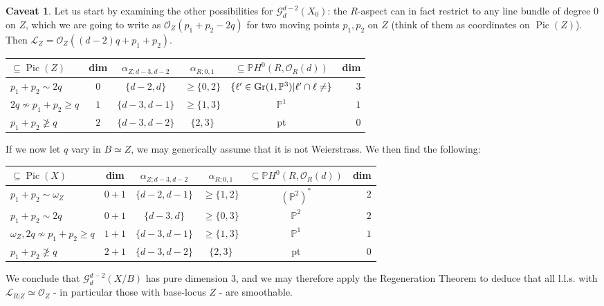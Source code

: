\documentclass[11pt]{amsart}
\newcommand{\PP}{\mathbb P}
\newcommand{\OO}{\mathcal O}
\newcommand{\Pic}{\operatorname{Pic}}
\theoremstyle{plain}
\theoremstyle{definition}
\newtheorem*{caveat}{Caveat}
\begin{document}
\begin{caveat}
 Let us start by examining the other possibilities for $\mathcal G^{d-2}_d(X_0)$: the $R$-aspect can in fact restrict to any line bundle of degree $0$ on $Z$, which we are going to write as $\OO_Z(p_1+p_2-2q)$ for two moving points $p_1,p_2$ on $Z$ (think of them as coordinates on $\Pic(Z)$). Then $\mathcal L_Z=\OO_Z((d-2)q+p_1+p_2)$.
 
 \smallskip
 
 \hspace{-.7cm} \begin{tabular}{lc|c|c|cr}
  $\subseteq\Pic(Z)$ & dim & $\alpha_{Z;d-3,d-2}$ & $\alpha_{R;0,1}$ & $\subseteq \PP H^0(R,\OO_R(d))$ & dim \\ \hline
  $p_1+p_2\sim 2q$ & $0$ & $\{d-2,d\}$ & $\geq\{0,2\}$ & $\{\ell^\prime\in\operatorname{Gr}(1,\PP^3)|\ell^\prime\cap\ell\neq\empty
  \}$ & $3$\\
  $2q\nsim p_1+p_2\geq q$ & $1$ & $\{d-3,d-1\}$ & $\geq\{1,3\}$ & $\PP^1$ & $1$\\
  $p_1+p_2\ngeq q$ & $2$ & $\{d-3,d-2\}$ & $\{2,3\}$ & pt & $0$\\
 \end{tabular}

 \smallskip
 
 If we now let $q$ vary in $B\simeq Z$, we may generically assume that it is not Weierstrass. We then find the following:
 
 \smallskip
 
 \hspace{-.7cm} \begin{tabular}{lc|c|c|cr}
  $\subseteq\Pic(X)$ & dim & $\alpha_{Z;d-3,d-2}$ & $\alpha_{R;0,1}$ & $\subseteq\PP H^0(R,\OO_R(d))$ & dim \\ \hline
  $p_1+p_2\sim \omega_Z$ & $0+1$ & $\{d-2,d-1\}$ & $\geq\{1,2\}$ & $(\PP^{2})^*$ & $2$\\
  $p_1+p_2\sim 2q$ & $0+1$ & $\{d-3,d\}$ & $\geq\{0,3\}$ & $\PP^2$ & $2$\\
  $\omega_Z,2q\nsim p_1+p_2\geq q$ & $1+1$ & $\{d-3,d-1\}$ & $\geq\{1,3\}$ & $\PP^1$ & $1$\\
  $p_1+p_2\ngeq q$ & $2+1$ & $\{d-3,d-2\}$ & $\{2,3\}$ & pt & $0$\\
 \end{tabular}
 
 \smallskip
 
 We conclude that $\mathcal G^{d-2}_d(X/B)$ has pure dimension $3$, and we may therefore apply the Regeneration Theorem to deduce that all l.l.s. with $\mathcal L_{R|Z}\simeq\OO_Z$ - in particular those with base-locus $Z$ - are smoothable.
\end{caveat}
\end{document}
